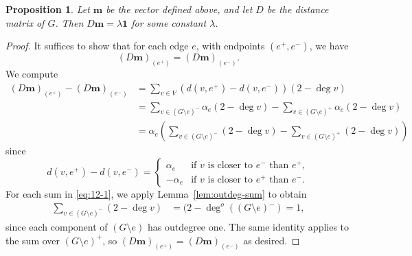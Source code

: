 \documentclass{amsart}
\newtheorem{prop}[thm]{Proposition}
\theoremstyle{definition}
\newcommand{\bone}{\mathbf{1}}
\newcommand{\boldm}{\mathbf{m}}
\newcommand{\degout}{\deg^o}
\newcommand{\note}[1]{{\color{red} \sf $\diamondsuit$  {#1} $\diamondsuit$ }}
\begin{document}
\begin{prop}
\label{prop:m-distance-warmup}
Let $\boldm$ be the vector defined above,
and let $D$ be the distance matrix of $G$.
Then $D \boldm = \lambda \bone$
for some constant $\lambda$.
\end{prop}
\begin{proof}

It suffices to show that for each edge $e$, with endpoints $(e^+,e^-)$, we have
\[ 
	(D \boldm)_{(e^+)} = (D \boldm)_{(e^-)} .
\]
We compute
\begin{align}
	(D \boldm)_{(e^+)} - (D \boldm)_{(e^-)} &= \sum_{v \in V} (d(v,e^+) - d(v,e^-)) (2 - \deg v) \\
	&= \sum_{v\in (G\setminus e)^-}  \alpha_e (2 - \deg v)  - \sum_{v\in (G\setminus e)^+} \alpha_e (2 - \deg v) \\
	&= \alpha_e \left( \sum_{v\in (G\setminus e)^-}  (2 - \deg v)  - \sum_{v\in (G\setminus e)^+} (2 - \deg v)\right) 
\label{eq:12-1}
\end{align}
since
\[
	d(v,e^+) - d(v,e^-) = \begin{cases}
	\alpha_e &\text{if $v$ is closer to $e^-$ than }e^+,\\
	- \alpha_e &\text{if $v$ is closer to $e^+$ than }e^-.
	\end{cases}
\]
For each sum in \eqref{eq:12-1}, we apply Lemma~\ref{lem:outdeg-sum} to obtain
\begin{align}
\sum_{v \in (G\setminus e)^-}  (2 - \deg v) &= (2 - \degout( (G\setminus e)^-) 
= 1 ,
\end{align}
since each component of $(G \setminus e)$ has outdegree one.
The same identity applies to the sum over $(G \setminus e)^+$, so $(D\boldm)_{(e^+)} = (D\boldm)_{(e^-)}$ as desired.
\end{proof}
\end{document}
